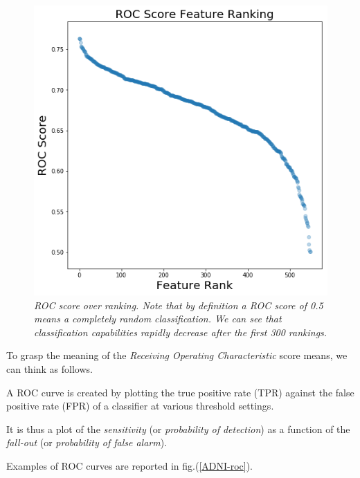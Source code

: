 \documentclass[12pt,openright,twoside,a4paper]{book}
\begin{document}
\begin{figure}[!h]
\centering
\includegraphics[scale=0.5]{ROC-feature-rank}
\caption{\textit{ROC score over ranking. Note that by definition a ROC score of 0.5 means a completely random classification. We can see that classification capabilities rapidly decrease after the first 300 rankings.}}
\label{ADNI-frank}
\end{figure}

To grasp the meaning of the \textit{Receiving Operating Characteristic} score means, we can think as follows. 

A ROC  curve is created by plotting the true positive rate (TPR) against the false positive rate (FPR) of a classifier at various threshold settings.

It is thus a plot of the \textit{sensitivity} (or \textit{probability of detection}) as a function of the \textit{fall-out} (or \textit{probability of false alarm}). 

Examples of ROC curves are reported in fig.(\ref{ADNI-roc}).
\end{document}
